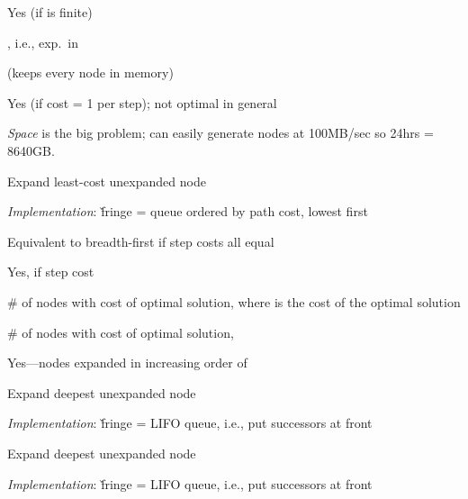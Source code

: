 \documentclass{article}
\begin{document}
\begin{huge}


 Yes (if  is finite)

 , i.e., exp.~in 

  (keeps every node in memory)

 Yes (if cost = 1 per step); not optimal in general

\emph{Space} is the big problem; can easily generate nodes at 100MB/sec\nl
so 24hrs = 8640GB.



Expand least-cost unexpanded node

\emph{Implementation}:\nl
\v{fringe} = queue ordered by path cost, lowest first

Equivalent to breadth-first if step costs all equal

 Yes, if step cost \mat{$\geq \epsilon$}

 \# of nodes with  cost of optimal solution, \al
where  is the cost of the optimal solution

 \# of nodes with  cost of optimal solution, 

 Yes---nodes expanded in increasing order of 



Expand deepest unexpanded node

\emph{Implementation}:\nl
\v{fringe} = LIFO queue, i.e., put successors at front

\textwidth
{}



Expand deepest unexpanded node

\emph{Implementation}:\nl
\v{fringe} = LIFO queue, i.e., put successors at front

\textwidth
{}



\end{huge}
\end{document}
